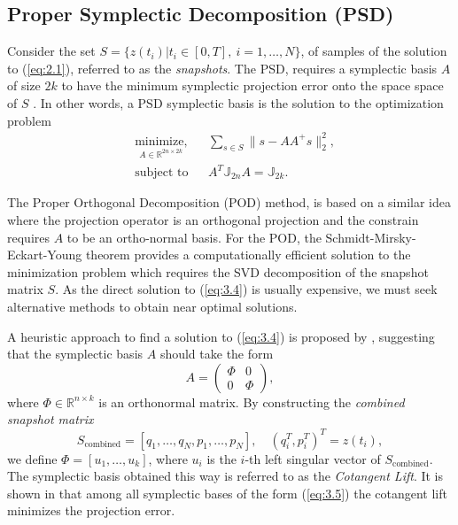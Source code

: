 \subsection{Proper Symplectic Decomposition (PSD)} Consider the set $S = \{z(t_i)| t_i\in[0,T],\ i=1,\dots,N\}$, of samples of the solution to (\ref{eq:2.1}), referred to as the \emph{snapshots}. The PSD, requires a symplectic basis $A$ of size $2k$ to have the minimum symplectic projection error onto the space space of $S$ . In other words, a PSD symplectic basis is the solution to the optimization problem
\begin{equation} \label{eq:3.4}
	\begin{aligned}
	& \underset{A \in \mathbb R^{2n\times 2k}}{\text{minimize}, }
	& & \sum_{s\in S} \| s - AA^+s\|_2^2, \\
	& \text{subject to}
	& & A^T \mathbb{J}_{2n}A = \mathbb{J}_{2k}.
	\end{aligned}
\end{equation}

The Proper Orthogonal Decomposition (POD) \cite{hesthaven2015certified,quarteroni2015reduced} method, is based on a similar idea where the projection operator is an orthogonal projection and the constrain requires $A$ to be an ortho-normal basis. For the POD, the Schmidt-Mirsky-Eckart-Young theorem \cite{Markovsky:2011:LRA:2103589} provides a computationally efficient solution to the minimization problem which requires the SVD decomposition of the snapshot matrix $S$. As the direct solution to (\ref{eq:3.4}) is usually expensive, we must seek alternative methods to obtain near optimal solutions.

A heuristic approach to find a solution to (\ref{eq:3.4}) is proposed by \cite{Peng:2014di}, suggesting that the symplectic basis $A$ should take the form
\begin{equation} \label{eq:3.5}
	A = 
	\begin{pmatrix}
		\Phi & 0 \\
		0 & \Phi
	\end{pmatrix},
\end{equation}
where $\Phi \in \mathbb{R}^{n\times k}$ is an orthonormal matrix. By constructing the \emph{combined snapshot matrix}
\begin{equation} \label{eq:3.6}
	S_{\text{combined}} = [q_1,\dots,q_N,p_1,\dots,p_N], \quad (q_i^T,p_i^T)^T = z(t_i),
\end{equation}
we define $\Phi=[u_1,\dots,u_k]$, where $u_i$ is the $i$-th left singular vector of $S_{\text{combined}}$. The symplectic basis obtained this way is referred to as the \emph{Cotangent Lift}. It is shown in \cite{Peng:2014di} that among all symplectic bases of the form (\ref{eq:3.5}) the cotangent lift minimizes the projection error. 

